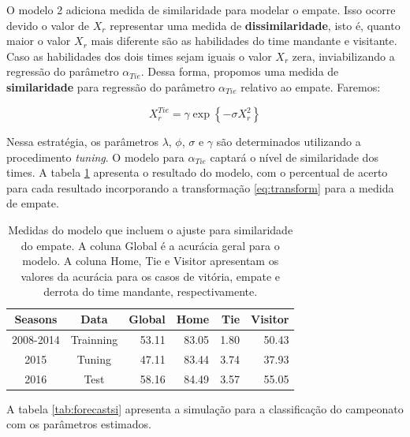 \documentclass[review]{elsarticle}
\begin{document}
O modelo 2 adiciona medida de similaridade para modelar o empate. Isso ocorre devido o valor de $X_r$ representar uma medida de \textbf{dissimilaridade}, isto é, quanto maior o valor $X_r$ mais diferente são as habilidades do time mandante e visitante. Caso as habilidades dos dois times sejam iguais o valor  $X_r$ zera, inviabilizando a regressão do parâmetro $\alpha_{Tie}$. Dessa forma, propomos uma medida de \textbf{similaridade} para regressão do parâmetro $\alpha_{Tie}$ relativo ao empate. Faremos:

\begin{equation}
X_r^{Tie} = \gamma \exp{\left\{-\sigma X_r ^2\right\}}
\label{eq:transform}
\end{equation}

Nessa estratégia, os parâmetros $\lambda$, $\phi$, $\sigma$ e $\gamma$ são determinados utilizando a procedimento \textit{tuning}. O modelo para $\alpha_{Tie}$ captará o nível de similaridade dos times. A tabela \ref{tab:medidasmodsi} apresenta o resultado do modelo, com o percentual de acerto para cada resultado incorporando a transformação \ref{eq:transform} para a medida de empate.

\begin{table}[!h]
\centering
\scriptsize
\begin{tabular}{cc|r|rrr}
  \hline
Seasons & Data & \textbf{Global} & Home & Tie & Visitor \\ 
  \hline
2008-2014 & Trainning & 53.11 & 83.05 & 1.80 & 50.43 \\ 
  2015 & Tuning & 47.11 & 83.44 & 3.74 & 37.93 \\ 
  2016 & Test & 58.16 & 84.49 & 3.57 & 55.05 \\ 
   \hline
\end{tabular}
    \caption[\scriptsize{Medidas do modelo com similaridade para o empate.}]{\scriptsize{Medidas do modelo que incluem o ajuste para similaridade do empate. A coluna Global é a acurácia geral para o modelo. A coluna Home, Tie e Visitor apresentam os valores da acurácia para os casos de vitória, empate e derrota do time mandante, respectivamente. }}
    \label{tab:medidasmodsi}
\end{table}	


A tabela \ref{tab:forecastsi} apresenta a simulação para a classificação do campeonato com os parâmetros estimados.
\end{document}
